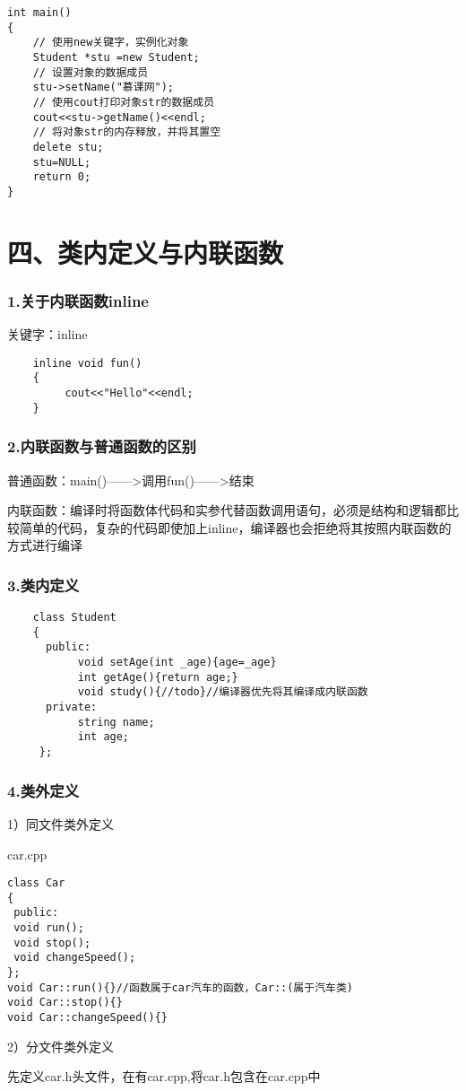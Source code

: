 \documentclass{article}
\begin{document}
\begin{CJK}{UTF8}{gbsn}
\begin{verbatim}
int main()
{
    // 使用new关键字，实例化对象
	Student *stu =new Student;
    // 设置对象的数据成员
	stu->setName("慕课网");
    // 使用cout打印对象str的数据成员
    cout<<stu->getName()<<endl;
    // 将对象str的内存释放，并将其置空
    delete stu;
    stu=NULL;
	return 0;
}
\end{verbatim}
\part*{四、类内定义与内联函数}
\section*{1.关于内联函数inline}
\subparagraph*{}
关键字：inline
\begin{verbatim}
    inline void fun()
    {
         cout<<"Hello"<<endl;
    }
\end{verbatim}
\section*{2.内联函数与普通函数的区别}
\subparagraph*{}
普通函数：main()——>调用fun()——>结束
\subparagraph*{}
内联函数：编译时将函数体代码和实参代替函数调用语句，必须是结构和逻辑都比较简单的代码，复杂的代码即使加上inline，编译器也会拒绝将其按照内联函数的方式进行编译
\section*{3.类内定义}
\begin{verbatim}
    class Student
    {
      public:
           void setAge(int _age){age=_age}
           int getAge(){return age;}
           void study(){//todo}//编译器优先将其编译成内联函数
      private:
           string name;
           int age;
     };
\end{verbatim}
\section*{4.类外定义}
\subparagraph*{}
1）同文件类外定义
\subparagraph*{}
car.cpp
\begin{verbatim}
class Car
{
 public:
 void run();
 void stop();
 void changeSpeed();
};
void Car::run(){}//函数属于car汽车的函数，Car::(属于汽车类)
void Car::stop(){}
void Car::changeSpeed(){}
\end{verbatim}
\subparagraph*{}
2）分文件类外定义
\subparagraph*{}
先定义car.h头文件，在有car.cpp,将car.h包含在car.cpp中

\end{CJK}
\end{document}
